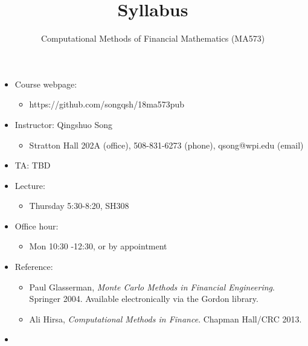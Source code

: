 \documentclass[11pt]{amsart}
\title{Syllabus}
\author{Computational Methods of Financial Mathematics (MA573)}
\begin{document}
\maketitle

\begin{itemize}
 
 \item Course webpage: 
\begin{itemize}
 \item  https://github.com/songqsh/18ma573pub
\end{itemize}

 \item Instructor: Qingshuo Song 
\begin{itemize}
 \item  Stratton Hall 202A (office),  508-831-6273 (phone), qsong@wpi.edu (email)
\end{itemize}
\item TA: TBD
\item Lecture:
\begin{itemize}
 \item Thursday 5:30-8:20,  SH308
\end{itemize}

 \item Office hour: 
\begin{itemize}
 \item Mon 10:30 -12:30, or by appointment
\end{itemize}

\item Reference:
\begin{itemize}
\item Paul Glasserman, \textit{Monte Carlo Methods in Financial Engineering}. Springer 2004. Available electronically via the Gordon library.
 \item Ali Hirsa, \textit{Computational Methods in Finance}. Chapman Hall/CRC 2013. 
\end{itemize}

\item











\end{itemize}
\end{document}
